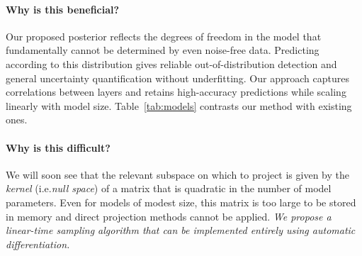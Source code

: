 \paragraph{Why is this beneficial?}
Our proposed posterior reflects the degrees of freedom in the model that fundamentally cannot be determined by even noise-free data. Predicting according to this distribution gives reliable out-of-distribution detection and general uncertainty quantification without underfitting. 
Our approach captures correlations between layers and retains high-accuracy predictions while scaling linearly with model size. %
Table~\ref{tab:models} contrasts our method with existing ones.

\paragraph{Why is this difficult?}
We will soon see that the relevant subspace on which to project is given by the \emph{kernel} (i.e.\@ \emph{null space}) of a matrix that is quadratic in the number of model parameters. Even for models of modest size, this matrix is too large to be stored in memory and direct projection methods cannot be applied. \emph{We propose a linear-time sampling algorithm that can be implemented entirely using automatic differentiation.}



